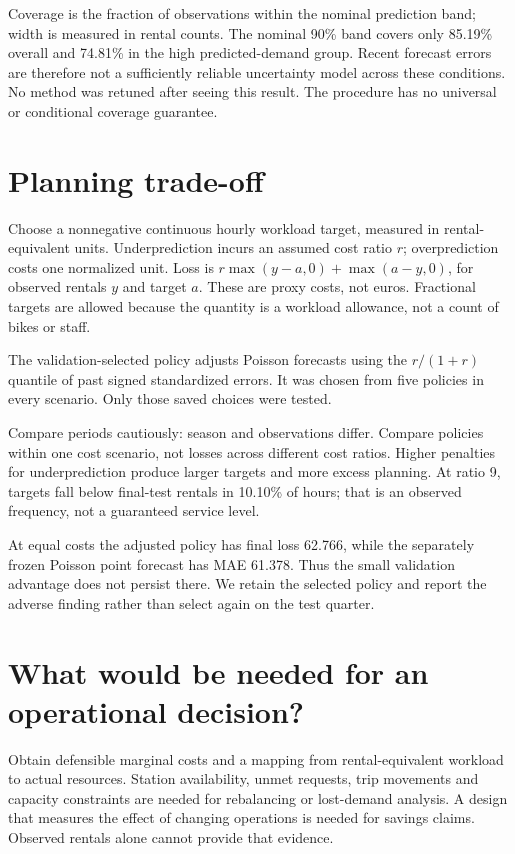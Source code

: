 \documentclass[11pt,a4paper]{article}
\begin{document}
\begin{center}\end{center}
Coverage is the fraction of observations within the nominal prediction band;
width is measured in rental counts. The nominal 90\% band covers only 85.19\%
overall and 74.81\% in the high predicted-demand group. Recent forecast errors
are therefore not a sufficiently reliable uncertainty model across these
conditions. No method was retuned after seeing this result. The procedure has
no universal or conditional coverage guarantee.

\newpage
\section*{Planning trade-off}
Choose a nonnegative continuous hourly workload target, measured in
rental-equivalent units. Underprediction incurs an assumed cost ratio $r$;
overprediction costs one normalized unit. Loss is
$r\max(y-a,0)+\max(a-y,0)$, for observed rentals $y$ and target $a$.
These are proxy costs, not euros. Fractional targets are allowed because the
quantity is a workload allowance, not a count of bikes or staff.

The validation-selected policy adjusts Poisson forecasts using the
$r/(1+r)$ quantile of past signed standardized errors. It was chosen from five
policies in every scenario. Only those saved choices were tested.
\begin{center}\end{center}
Compare periods cautiously: season and observations differ. Compare policies
within one cost scenario, not losses across different cost ratios. Higher
penalties for underprediction produce larger targets and more excess planning.
At ratio 9, targets fall below final-test rentals in 10.10\% of hours; that is an
observed frequency, not a guaranteed service level.

At equal costs the adjusted policy has final loss 62.766, while the separately
frozen Poisson point forecast has MAE 61.378. Thus the small validation advantage
does not persist there. We retain the selected policy and report the adverse
finding rather than select again on the test quarter.

\section*{What would be needed for an operational decision?}
Obtain defensible marginal costs and a mapping from rental-equivalent workload
to actual resources. Station availability, unmet requests, trip movements and
capacity constraints are needed for rebalancing or lost-demand analysis. A design
that measures the effect of changing operations is needed for savings claims.
Observed rentals alone cannot provide that evidence.
\end{document}
